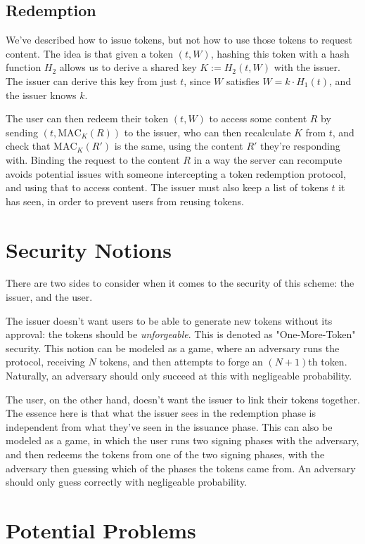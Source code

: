 \documentclass[9pt, a4paper]{article}
\begin{document}
\subsection{Redemption}

We've described how to issue tokens, but not how to use those
tokens to request content. The idea is that given a token $(t, W)$,
hashing this token with a hash function $H_2$ allows us to derive
a shared key $K := H_2(t, W)$ with the issuer. The issuer can derive this
key from just $t$, since $W$ satisfies $W = k \cdot H_1(t)$, and the
issuer knows $k$.

The user can then redeem their token $(t, W)$ to access some content $R$
by sending $(t, \text{MAC}_K(R))$ to the issuer, who can then recalculate
$K$ from $t$, and check that $\text{MAC}_K(R')$ is the same, using
the content $R'$ they're responding with. Binding the
request to the content $R$ in a way the server can recompute
avoids potential issues with someone intercepting a token
redemption protocol, and using that to access content.
The issuer must also keep a list of tokens $t$ it has seen, in order
to prevent users from reusing tokens.

\section{Security Notions}

There are two sides to consider when it comes to the security
of this scheme: the issuer, and the user.

The issuer doesn't want users to be able to generate new tokens
without its approval: the tokens should be \emph{unforgeable}.
This is denoted as "One-More-Token" security. This notion
can be modeled as a game, where an adversary runs the protocol,
receiving $N$ tokens, and then attempts to forge an $(N+1)$th token.
Naturally, an adversary should only succeed at this with negligeable
probability.

The user, on the other hand, doesn't want the issuer to link their
tokens together. The essence here is that what the issuer sees
in the redemption phase is independent from what they've seen
in the issuance phase. This can also be modeled as a game, in which
the user runs two signing phases with the adversary, and then
redeems the tokens from one of the two signing phases, with
the adversary then guessing which of the phases the tokens came from.
An adversary should only guess correctly with negligeable probability.

\section{Potential Problems}
\end{document}
